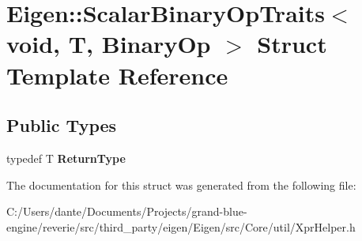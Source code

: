 \hypertarget{struct_eigen_1_1_scalar_binary_op_traits_3_01void_00_01_t_00_01_binary_op_01_4}{}\section{Eigen\+::Scalar\+Binary\+Op\+Traits$<$ void, T, Binary\+Op $>$ Struct Template Reference}
\label{struct_eigen_1_1_scalar_binary_op_traits_3_01void_00_01_t_00_01_binary_op_01_4}
\subsection*{Public Types}
\begin{DoxyCompactItemize}
\item 
\mbox{\label{struct_eigen_1_1_scalar_binary_op_traits_3_01void_00_01_t_00_01_binary_op_01_4_a74cfc68c9c5a4440874c383b773be35d}} 
typedef T {\bfseries Return\+Type}
\end{DoxyCompactItemize}


The documentation for this struct was generated from the following file\+:\begin{DoxyCompactItemize}
\item 
C\+:/\+Users/dante/\+Documents/\+Projects/grand-\/blue-\/engine/reverie/src/third\+\_\+party/eigen/\+Eigen/src/\+Core/util/Xpr\+Helper.\+h\end{DoxyCompactItemize}
